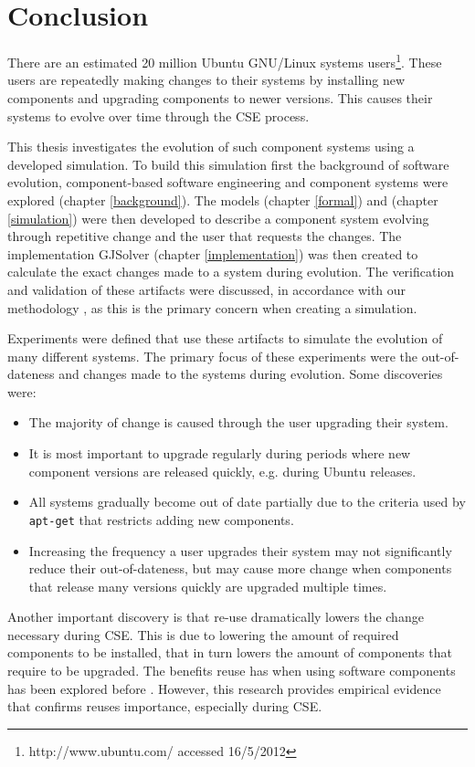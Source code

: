\chapter{Conclusion}
\label{conclusion}
There are an estimated 20 million Ubuntu GNU/Linux systems users\footnote{http://www.ubuntu.com/ accessed 16/5/2012}.
These users are repeatedly making changes to their systems by installing new components and upgrading components to newer versions.
This causes their systems to evolve over time through the CSE process.

This thesis investigates the evolution of such component systems using a developed simulation.
To build this simulation first the background of software evolution, component-based software engineering and component systems were explored (chapter \ref{background}).
The models \modelname (chapter \ref{formal}) and \usermodel (chapter \ref{simulation}) were then developed 
to describe a component system evolving through repetitive change and the user that requests the changes.
The implementation GJSolver (chapter \ref{implementation}) was then created to calculate the exact changes made to a system during evolution.
The verification and validation of these artifacts were discussed, in accordance with our methodology \cite{Law2005}, 
as this is the primary concern when creating a simulation.

Experiments were defined that use these artifacts to simulate the evolution of many different systems.
The primary focus of these experiments were the out-of-dateness and changes made to the systems during evolution.
Some discoveries were:
\begin{itemize}
  \item The majority of change is caused through the user upgrading their system.
  \item It is most important to upgrade regularly during periods where new component versions are released quickly, e.g. during Ubuntu releases.
  \item All systems gradually become out of date partially due to the criteria used by \texttt{apt-get} that restricts adding new components.
  \item Increasing the frequency a user upgrades their system may not significantly reduce their out-of-dateness, 
  but may cause more change when components that release many versions quickly are upgraded multiple times.
\end{itemize} 

Another important discovery is that re-use dramatically lowers the change necessary during CSE.
This is due to lowering the amount of required components to be installed,
that in turn lowers the amount of components that require to be upgraded.
The benefits reuse has when using software components has been explored before \citep{Szyperski2002}.
However, this research provides empirical evidence that confirms reuses importance, especially during CSE.

